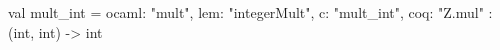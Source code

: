 val mult_int = {ocaml: "mult", lem: "integerMult", c: "mult_int", coq: "Z.mul"} : (int, int) -> int
